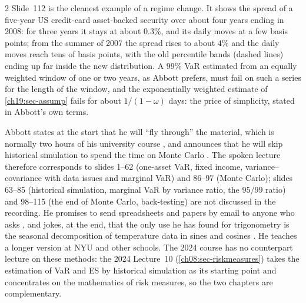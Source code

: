 \begin{paracol}{2}
Slide~112 is the cleanest example of a regime change. It shows the spread of a five-year US credit-card asset-backed security over about four years ending in 2008: for three years it stays at about $0.3\%$, and its daily moves at a few basis points; from the summer of 2007 the spread rises to about $4\%$ and the daily moves reach tens of basis points, with the old percentile bands (dashed lines) ending up far inside the new distribution. A $99\%$ VaR estimated from an equally weighted window of one or two years, as Abbott prefers, must fail on such a series for the length of the window, and the exponentially weighted estimate of \cref{ch19:sec-assump} fails for about $1/(1-\omega)$ days: the price of simplicity, stated in Abbott's own terms.

\begin{coursenote}\label{ch19:cn-scope}
Abbott states at the start that he will ``fly through'' the material, which is normally two hours of his university course , and announces that he will skip historical simulation to spend the time on Monte Carlo . The spoken lecture therefore corresponds to slides 1--62 (one-asset VaR, fixed income, variance--covariance with data issues and marginal VaR) and 86--97 (Monte Carlo); slides 63--85 (historical simulation, marginal VaR by variance ratio, the $95/99$ ratio) and 98--115 (the end of Monte Carlo, back-testing) are not discussed in the recording. He promises to send spreadsheets and papers by email to anyone who asks , and jokes, at the end, that the only use he has found for trigonometry is the seasonal decomposition of temperature data in sines and cosines . He teaches a longer version at NYU and other schools. The 2024 course has no counterpart lecture on these methods: the 2024 Lecture~10 (\cref{ch08:sec-riskmeasures}) takes the estimation of VaR and ES by historical simulation as its starting point and concentrates on the mathematics of risk measures, so the two chapters are complementary.
\end{coursenote}


\end{paracol}
